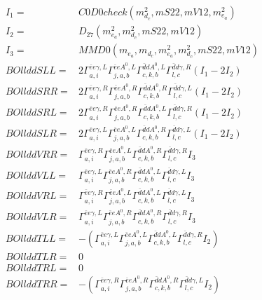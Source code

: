 \documentclass[A4,landscape]{article}
\begin{document}
\begin{align} 
I_1 = & C0D0check(m^2_{d_{{c}}}, mS22, mV12, m^2_{e_{{a}}}) \\ 
I_2 = & D_{27}(m^2_{e_{{a}}}, m^2_{d_{{c}}}, mS22, mV12) \\ 
I_3 = & MMD0(m_{e_{{a}}}, m_{d_{{c}}}, m^2_{e_{{a}}}, m^2_{d_{{c}}}, mS22, mV12) \\ 
  BOllddSLL= & 2  \Gamma^{\bar{e}e \gamma ,L}_{a, i} \Gamma^{\bar{e}e A^0 ,L}_{j, a, b} \Gamma^{\bar{d}d A^0 ,L}_{c, k, b} \Gamma^{\bar{d}d \gamma ,R}_{l, c} (I_1 - 2 I_2) \\ 
  BOllddSRR= & 2  \Gamma^{\bar{e}e \gamma ,R}_{a, i} \Gamma^{\bar{e}e A^0 ,R}_{j, a, b} \Gamma^{\bar{d}d A^0 ,R}_{c, k, b} \Gamma^{\bar{d}d \gamma ,L}_{l, c} (I_1 - 2 I_2) \\ 
  BOllddSRL= & 2  \Gamma^{\bar{e}e \gamma ,R}_{a, i} \Gamma^{\bar{e}e A^0 ,R}_{j, a, b} \Gamma^{\bar{d}d A^0 ,L}_{c, k, b} \Gamma^{\bar{d}d \gamma ,R}_{l, c} (I_1 - 2 I_2) \\ 
  BOllddSLR= & 2  \Gamma^{\bar{e}e \gamma ,L}_{a, i} \Gamma^{\bar{e}e A^0 ,L}_{j, a, b} \Gamma^{\bar{d}d A^0 ,R}_{c, k, b} \Gamma^{\bar{d}d \gamma ,L}_{l, c} (I_1 - 2 I_2) \\ 
  BOllddVRR= &  \Gamma^{\bar{e}e \gamma ,R}_{a, i} \Gamma^{\bar{e}e A^0 ,L}_{j, a, b} \Gamma^{\bar{d}d A^0 ,R}_{c, k, b} \Gamma^{\bar{d}d \gamma ,R}_{l, c} I_3 \\ 
  BOllddVLL= &  \Gamma^{\bar{e}e \gamma ,L}_{a, i} \Gamma^{\bar{e}e A^0 ,R}_{j, a, b} \Gamma^{\bar{d}d A^0 ,L}_{c, k, b} \Gamma^{\bar{d}d \gamma ,L}_{l, c} I_3 \\ 
  BOllddVRL= &  \Gamma^{\bar{e}e \gamma ,R}_{a, i} \Gamma^{\bar{e}e A^0 ,L}_{j, a, b} \Gamma^{\bar{d}d A^0 ,L}_{c, k, b} \Gamma^{\bar{d}d \gamma ,L}_{l, c} I_3 \\ 
  BOllddVLR= &  \Gamma^{\bar{e}e \gamma ,L}_{a, i} \Gamma^{\bar{e}e A^0 ,R}_{j, a, b} \Gamma^{\bar{d}d A^0 ,R}_{c, k, b} \Gamma^{\bar{d}d \gamma ,R}_{l, c} I_3 \\ 
  BOllddTLL= & -( \Gamma^{\bar{e}e \gamma ,L}_{a, i} \Gamma^{\bar{e}e A^0 ,L}_{j, a, b} \Gamma^{\bar{d}d A^0 ,L}_{c, k, b} \Gamma^{\bar{d}d \gamma ,R}_{l, c} I_2) \\ 
  BOllddTLR= & 0 \\ 
  BOllddTRL= & 0 \\ 
  BOllddTRR= & -( \Gamma^{\bar{e}e \gamma ,R}_{a, i} \Gamma^{\bar{e}e A^0 ,R}_{j, a, b} \Gamma^{\bar{d}d A^0 ,R}_{c, k, b} \Gamma^{\bar{d}d \gamma ,L}_{l, c} I_2) \\ 
\end{align} 
\end{document}
